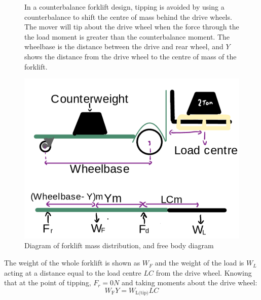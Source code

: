 \documentclass[12pt]{article}
\begin{document}
\begin{figure}[H]
    \centering
    \begin{minipage}[t]{0.57\textwidth}
        \vspace{0pt} %
        In a counterbalance forklift design, tipping is avoided by using a counterbalance to shift the centre of mass behind the drive wheels. The mover will tip about the drive wheel when the force through the the load moment is greater than the counterbalance moment. The wheelbase is the distance between the drive and rear wheel, and \( Y \) shows the distance from the drive wheel to the centre of mass of the forklift. 
    \end{minipage}%
    \hfill
    \begin{minipage}[t]{0.38\textwidth}
        \vspace{-30pt} 
        \centering
        \includegraphics[width=\linewidth]{Tipping Calculations 3.png}
        \vspace{-30pt}
        \caption{Diagram of forklift mass distribution, and free body diagram}
        \label{fig:x}
    \end{minipage}
\end{figure}
The weight of the whole forklift is shown as \(W_F\) and the weight of the load is \(W_L\) acting at a distance equal to the load centre \(LC\) from the drive wheel. Knowing that at the point of tipping, $F_r = 0N$ and taking moments about the drive wheel:
\vspace{-10pt}
\begin{equation}
    W_{\text{F}}Y = W_{\text{L(tip)}}LC
\end{equation}
\vspace{-35pt}
\end{document}
